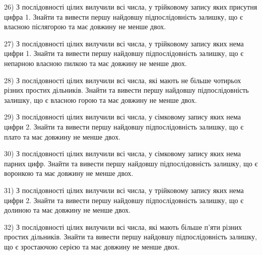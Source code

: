 \documentclass[11pt, ukrainian]{article}
\begin{document}
\par
\vspace{0.9cm}
26) \space 
З послідовності цілих вилучили всі числа, у трійковому запису яких присутня цифра 1. Знайти та вивести першу найдовшу підпослідовність залишку, що є власною післягорою та має довжину не менше двох.

\par
\vspace{0.9cm}
27) \space 
З послідовності цілих вилучили всі числа, у трійковому запису яких нема цифри 1. Знайти та вивести першу найдовшу підпослідовність залишку, що є непарною власною пилкою та має довжину не менше двох.

\par
\vspace{0.9cm}
28) \space 
З послідовності цілих вилучили всі числа, які мають не більше чотирьох різних простих дільників. Знайти та вивести першу найдовшу підпослідовність залишку, що є власною горою та має довжину не менше двох.

\par
\vspace{0.9cm}
29) \space 
З послідовності цілих вилучили всі числа, у сімковому запису яких нема цифри 2. Знайти та вивести першу найдовшу підпослідовність залишку, що є плато та має довжину не менше двох.

\par
\vspace{0.9cm}
30) \space 
З послідовності цілих вилучили всі числа, у сімковому запису яких нема парних цифр. Знайти та вивести першу найдовшу підпослідовність залишку, що є воронкою та має довжину не менше двох.

\par
\vspace{0.9cm}
31) \space 
З послідовності цілих вилучили всі числа, у трійковому запису яких нема цифри 2. Знайти та вивести першу найдовшу підпослідовність залишку, що є долиною та має довжину не менше двох.

\par
\vspace{0.9cm}
32) \space 
З послідовності цілих вилучили всі числа, які мають більше п'яти різних простих дільників. Знайти та вивести першу найдовшу підпослідовність залишку, що є зростаючою серією та має довжину не менше двох.
\end{document}
